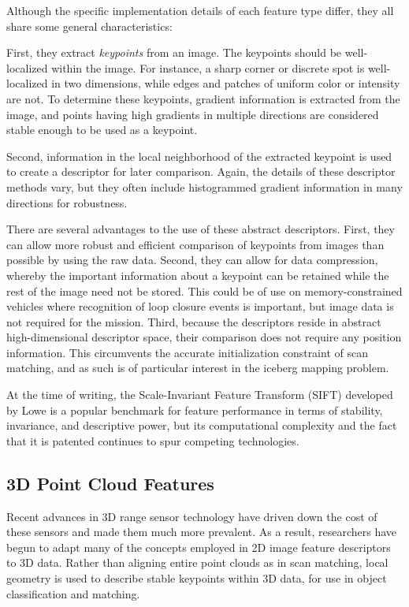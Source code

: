 Although the specific implementation details of each feature type differ, they all share some general characteristics:

First, they extract \emph{keypoints} from an image. The keypoints should be well-localized within the image. For instance, a sharp corner or discrete spot is well-localized in two dimensions, while edges and patches of uniform color or intensity are not. To determine these keypoints, gradient information is extracted from the image, and points having high gradients in multiple directions are considered stable enough to be used as a keypoint. 

Second, information in the local neighborhood of the extracted keypoint is used to create a descriptor for later comparison. Again, the details of these descriptor methods vary, but they often include histogrammed gradient information in many directions for robustness. 

There are several advantages to the use of these abstract descriptors. First, they can allow more robust and efficient comparison of keypoints from images than possible by using the raw data. Second, they can allow for data compression, whereby the important information about a keypoint can be retained while the rest of the image need not be stored. This could be of use on memory-constrained vehicles where recognition of loop closure events is important, but image data is not required for the mission. Third, because the descriptors reside in abstract high-dimensional descriptor space, their comparison does not require any position information. This circumvents the accurate initialization constraint of scan matching, and as such is of particular interest in the iceberg mapping problem.

At the time of writing, the Scale-Invariant Feature Transform (SIFT) developed by Lowe \cite{Lowe2004} is a popular benchmark for feature performance in terms of stability, invariance, and descriptive power, but its computational complexity and the fact that it is patented continues to spur competing technologies.

\subsection{3D Point Cloud Features}

Recent advances in 3D range sensor technology have driven down the cost of these sensors and made them much more prevalent. As a result, researchers have begun to adapt many of the concepts employed in 2D image feature descriptors to 3D data. Rather than aligning entire point clouds as in scan matching, local geometry is used to describe stable keypoints within 3D data, for use in object classification and matching. 

